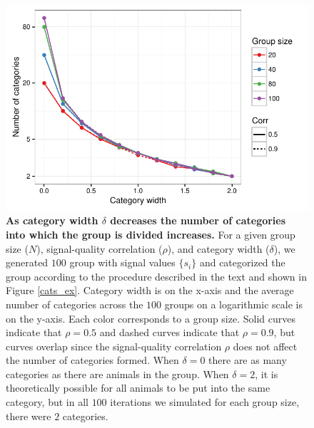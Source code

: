 \begin{figure}[ht]
\includegraphics[width=.8\textwidth]{figures/number_of_categories.pdf}
\caption{\sffamily\small\textbf{As category width $\delta$ decreases the number of categories into which the group is divided increases.}
For a given group size ($N$), signal-quality correlation ($\rho$), and category width ($\delta$), we generated $100$ group with signal values $\{s_i\}$ and categorized the group according to the procedure described in the text and shown in Figure \ref{cats_ex}.  Category width is on the x-axis and the average number of categories across the $100$ groups on a logarithmic scale is on the y-axis. Each color corresponds to a group size. Solid curves indicate that $\rho=0.5$ and dashed curves indicate that $\rho=0.9$, but curves overlap since the signal-quality correlation $\rho$ does not affect the number of categories formed. When $\delta=0$ there are as many categories as there are animals in the group. When $\delta=2$, it is theoretically possible for all animals to be put into the same category, but in all $100$ iterations we simulated for each group size, there were $2$ categories. }
\label{num_cat}
\end{figure}

